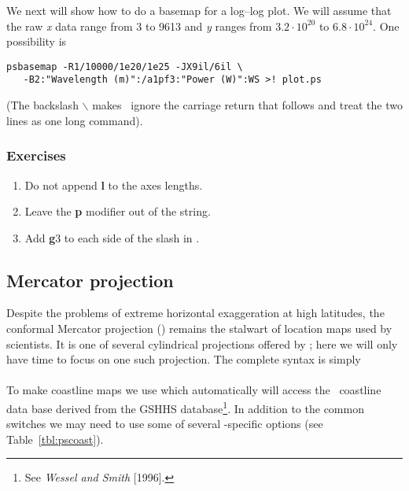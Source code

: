 \documentclass{report}
\begin{document}
We next will show how to do a basemap for a log--log plot.  We will
assume that the raw {\it x} data range from 3 to 9613 and {\it y}
ranges from $3.2 \cdot 10^{20}$ to $6.8 \cdot 10^{24}$.  One possibility is

\begin{verbatim} 
psbasemap -R1/10000/1e20/1e25 -JX9il/6il \
   -B2:"Wavelength (m)":/a1pf3:"Power (W)":WS >! plot.ps 
\end{verbatim}

\noindent
(The backslash $\backslash$ makes \UNIX\ ignore the carriage return that follows and treat the two lines as one long command).

\subsubsection{Exercises}

\begin{enumerate}

\item Do not append {\bf l} to the axes lengths.

\item Leave the {\bf p} modifier out of the  string.

\item Add {\bf g}3 to each side of the slash in .

\end{enumerate}

\subsection{Mercator projection}

Despite the problems of extreme horizontal exaggeration at high
latitudes, the conformal Mercator projection () remains
the stalwart of location maps used by scientists.  It is one
of several cylindrical projections offered by \GMT; here we
will only have time to focus on one such projection.  The
complete syntax is simply \\

 \\

To make coastline maps we use  which automatically will
access the \GMT\ coastline data base derived from the GSHHS
database\footnote{See {\it Wessel and Smith} [1996].}.  In addition
to the common switches we may need to use some of several 
-specific options (see Table~\ref{tbl:pscoast}).
\end{document}
